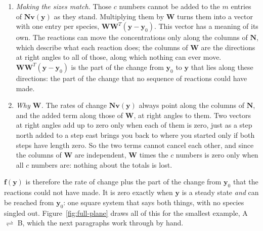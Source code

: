 \documentclass[11pt,a4paper,openany]{report}
\begin{document}
{{\begin{enumerate}
  is the same for every choice, since $\mathbf{W}' \mathbf{W}'^T =
  \mathbf{W} \mathbf{U} \mathbf{U}^T \mathbf{W}^T = \mathbf{W}
  \mathbf{W}^T$, so $\mathbf{f}(\mathbf{y})$ and its solution are too.
  ($\mathbf{W}$ is not the kernel matrix
  $\mathbf{K}$, which holds flux modes, the null space of $\mathbf{N}$;
  $\mathbf{W}$ spans the null space of $\mathbf{N}^T$.) So
  $\mathbf{W}^T \mathbf{y}$ lists the conserved totals of $\mathbf{y}$, and
  $\mathbf{W}^T \mathbf{y} - \mathbf{W}^T \mathbf{y}_0 = \mathbf{W}^T (\mathbf{y} - \mathbf{y}_0)$ says how far
  they are from the totals at the start: $c$ numbers, which must all be
  zero.
\item \emph{Making the sizes match.} Those $c$ numbers cannot be added to
  the $m$ entries of $\mathbf{N} \mathbf{v}(\mathbf{y})$ as they stand. Multiplying them by
  $\mathbf{W}$ turns them into a vector with one entry per species,
  $\mathbf{W} \mathbf{W}^T (\mathbf{y} - \mathbf{y}_0)$. This vector has a meaning of its own.
  The reactions can move the concentrations only along the columns of
  $\mathbf{N}$, which describe what each reaction does; the columns of
  $\mathbf{W}$ are the directions at right angles to all of those, along
  which nothing can ever move. $\mathbf{W} \mathbf{W}^T (\mathbf{y} - \mathbf{y}_0)$ is the
  part of the change from $\mathbf{y}_0$ to $\mathbf{y}$ that lies along these directions:
  the part of the change that no sequence of reactions could have made.
\item \emph{Why $\mathbf{W}$.} The rates of change $\mathbf{N} \mathbf{v}(\mathbf{y})$ always
  point along the columns of $\mathbf{N}$, and the added term along those
  of $\mathbf{W}$, at right angles to them. Two vectors at right angles add
  up to zero only when each of them is zero, just as a step north added to
  a step east brings you back to where you started only if both steps have
  length zero. So the two terms cannot cancel each other, and since the
  columns of $\mathbf{W}$ are independent, $\mathbf{W}$ times the $c$
  numbers is zero only when all $c$ numbers are: nothing about the totals
  is lost.
\end{enumerate}

$\mathbf{f}(\mathbf{y})$ is therefore the rate of change plus the part of the change from
$\mathbf{y}_0$ that the reactions could not have made. It is zero exactly when $\mathbf{y}$
is a steady state \emph{and} can be reached from $\mathbf{y}_0$: one square system
that says both things, with no species singled out. Figure~\ref{fig:full-plane} draws all of this for the smallest
example, A $\rightleftharpoons$ B, which the next paragraphs work through by hand.

}}
\end{document}
